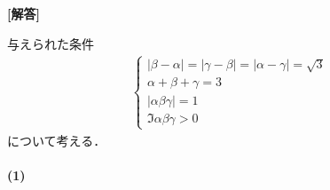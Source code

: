 \documentclass[../../main.tex]{subfiles}
\begin{document}
\begin{oframed}
  
\end{oframed}

{\bf [解答]}

与えられた条件
\begin{align}
  \begin{cases}
    |\beta-\alpha|=|\gamma-\beta|=|\alpha-\gamma|=\sqrt{3} \\
    \alpha+\beta+\gamma=3 \\
    |\alpha\beta\gamma| = 1 \\
    \Im \alpha\beta\gamma > 0
  \end{cases} \label{eq:1}
\end{align}
について考える．

\paragraph{(1)}
\end{document}
